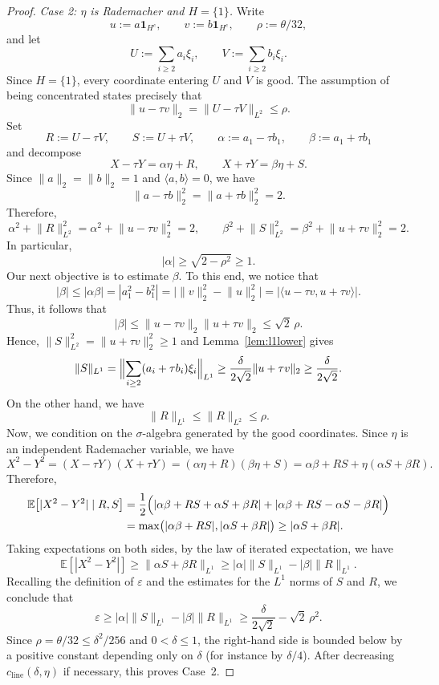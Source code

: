 \documentclass[10pt,a4paper]{amsart}
\newcommand{\E}{\mathbb E}
\newcommand{\abs}[1]{\lvert #1 \rvert}
\newcommand{\eps}{\varepsilon}
\newcommand{\ip}[2]{\langle #1,#2\rangle}
\newcommand{\norm}[1]{\lVert #1 \rVert}
\begin{document}
\begin{proof}
\noindent\emph{Case 2: $\eta$ is Rademacher and $H=\{1\}$.}
Write
\[
u:=a\mathbf 1_{H^c},
\qquad
v:=b\mathbf 1_{H^c},
\qquad
\rho:=\theta/32,
\]
and let
\[
U:=\sum_{i\ge2} a_i\xi_i,
\qquad
V:=\sum_{i\ge2} b_i\xi_i.
\]
Since $H=\{1\}$, every coordinate entering $U$ and $V$ is good.  The
 assumption of being concentrated states precisely that
\[
\norm{u-\tau v}_2=\norm{U-\tau V}_{L^2}\le \rho.
\]
Set
\[
R:=U-\tau V,
\qquad
S:=U+\tau V,
\qquad
\alpha:=a_1-\tau b_1,
\qquad
\beta:=a_1+\tau b_1
\]
and decompose
\[
X-\tau Y=\alpha\eta+R,
\qquad
X+\tau Y=\beta\eta+S.
\]
Since $\norm{a}_2=\norm{b}_2=1$ and $\ip{a}{b}=0$, we have
\[
\norm{a-\tau b}_2^2=\norm{a+\tau b}_2^2=2.
\]
Therefore,
\[
\alpha^2+\norm{R}_{L^2}^2
=\alpha^2+\norm{u-\tau v}_2^2
=2,
\qquad
\beta^2+\norm{S}_{L^2}^2
=\beta^2+\norm{u+\tau v}_2^2
=2.
\]
In particular,
\[
|\alpha|\ge \sqrt{2-\rho^2}\ge1.
\]
Our next objective is to estimate $\beta$. To this end, we notice that
\[
|\beta|\le |\alpha\beta|
=|a_1^2-b_1^2|
=\bigl|\norm{v}_2^2-\norm{u}_2^2\bigr|
=\bigl|\langle u-\tau v,u+\tau v\rangle\bigr|.
\]
Thus, it follows that
\[
|\beta|
\le \norm{u-\tau v}_2\norm{u+\tau v}_2
\le \sqrt2\,\rho.
\]
Hence, $\norm{S}_{L^2}^2 = \|u+\tau v\|_2^2\ge1$ and Lemma~\ref{lem:l1lower} gives
\[
\norm{S}_{L^1}
=\Bigl\|\sum_{i\ge2}(a_i+\tau b_i)\xi_i\Bigr\|_{L^1}
\ge \frac{\delta}{2\sqrt2}\norm{u+\tau v}_2
\ge \frac{\delta}{2\sqrt2}.
\]
On the other hand, we have
\[
\norm{R}_{L^1}\le \norm{R}_{L^2}\le \rho.
\]
Now, we condition on the $\sigma$-algebra generated by the good coordinates.  Since
$\eta$ is an independent Rademacher variable, we have
\[
X^2-Y^2
=(X-\tau Y)(X+\tau Y)
=(\alpha\eta+R)(\beta\eta+S)
=\alpha\beta+RS+\eta(\alpha S+\beta R).
\]
Therefore,
\begin{align*}
    \E\bigl[\abs{X^2-Y^2}\mid R,S\bigr]
&=\frac12\Bigl(
\abs{\alpha\beta+RS+\alpha S+\beta R}
+
\abs{\alpha\beta+RS-\alpha S-\beta R}
\Bigr)
\\
&=\max\bigl(\abs{\alpha\beta+RS},\abs{\alpha S+\beta R}\bigr)
\ge \abs{\alpha S+\beta R}.
\end{align*}
Taking expectations on both sides, by the law of iterated expectation, we have 
\begin{equation*}
\E[|X^2-Y^2|]\ge \|\alpha S+\beta R\|_{L^1}\ge  |\alpha|\|S\|_{L^1}-|\beta|\|R\|_{L^1}.
\end{equation*}
Recalling the definition of $\varepsilon$ and the estimates for the $L^1$ norms of $S$ and $R$, we conclude that
\[
\eps
\ge |\alpha|\norm{S}_{L^1}-|\beta|\norm{R}_{L^1}
\ge \frac{\delta}{2\sqrt2}-\sqrt2\,\rho^2.
\]
Since $\rho=\theta/32\le \delta^2/256$ and $0<\delta\le1$, the right-hand side
is bounded below by a positive constant depending only on $\delta$ (for
instance by $\delta/4$).  After decreasing
$c_{\mathrm{line}}(\delta,\eta)$ if necessary, this proves Case~2.
\end{proof}
\end{document}
